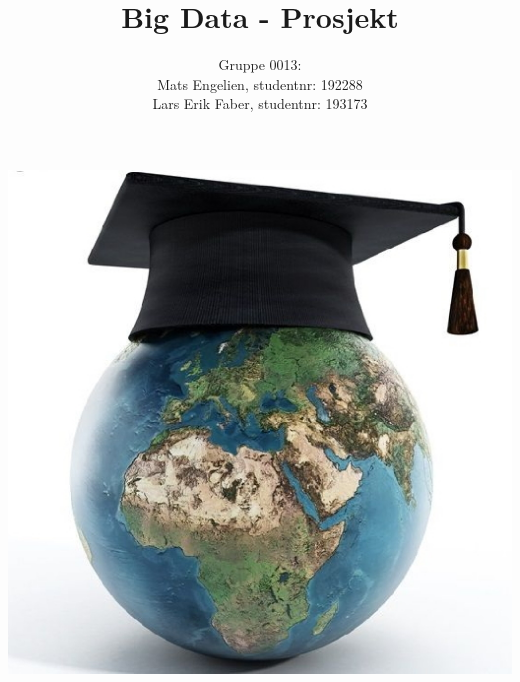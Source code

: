 \documentclass[12pt]{article}
\begin{document}
\title{Big Data - Prosjekt}
\author{%
    Gruppe 0013:\\
    Mats Engelien, studentnr: 192288\\
    Lars Erik Faber, studentnr: 193173}
\date{}
\maketitle
\begin{center}
    \includegraphics[scale=1]{images/world_education.jpg}    
\end{center}
\thispagestyle{empty}
\newpage
\tableofcontents
\thispagestyle{empty}
\newpage
\setcounter{page}{1}



\newpage

\newpage

\newpage

\newpage

\newpage

\newpage

\newpage

\end{document}

